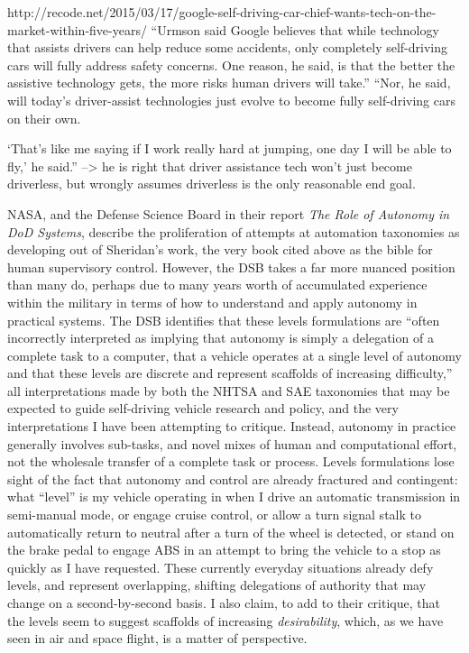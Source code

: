 http://recode.net/2015/03/17/google-self-driving-car-chief-wants-tech-on-the-market-within-five-years/
``Urmson said Google believes that while technology that assists drivers
can help reduce some accidents, only completely self-driving cars will
fully address safety concerns. One reason, he said, is that the better
the assistive technology gets, the more risks human drivers will
take.''
``Nor, he said, will today's driver-assist technologies just evolve to
become fully self-driving cars on their own.

`That’s like me saying if I work really hard at jumping, one day I
will be able to fly,' he said.''
--> he is right that driver assistance tech won't just become
driverless, but wrongly assumes driverless is the only reasonable end goal.


NASA, and the Defense Science Board in their report \emph{The Role of
Autonomy in DoD Systems}, describe the proliferation of attempts at
automation taxonomies as developing out of Sheridan's work, the very
book cited above as the bible for human supervisory control.\cite{???}
However, the DSB takes a far more nuanced position than many do,
perhaps due to many years worth of accumulated experience within the
military in terms of how to understand and apply autonomy in practical
systems. The DSB
identifies that these levels formulations are ``often incorrectly
interpreted as implying that autonomy is simply a delegation of a
complete task to a computer, that a vehicle operates at a single level
of autonomy and that these levels are discrete and represent scaffolds
of increasing difficulty,''\cite{???} all interpretations made by both the
NHTSA and SAE taxonomies that may be expected to guide self-driving
vehicle research and policy, and the very interpretations I have been
attempting to critique. Instead, autonomy in practice generally
involves sub-tasks, and novel mixes of human and computational effort,
not the wholesale transfer of a complete task or process. Levels
formulations lose sight of the fact that autonomy and control are
already fractured and contingent:  what ``level'' is my vehicle
operating in when I drive an automatic transmission in semi-manual
mode, or engage cruise control, or allow a turn signal stalk to
automatically return to neutral after a turn of the wheel is detected,
or stand on the brake pedal to engage ABS in an attempt to bring the
vehicle to a stop as quickly as I have requested. These currently
everyday situations already defy levels, and represent overlapping, shifting
delegations of authority that may change on a second-by-second basis.
I also claim, to add to their critique, that the
levels seem to suggest scaffolds of increasing \emph{desirability},
which, as we have seen in air and space flight, is a matter of perspective.

